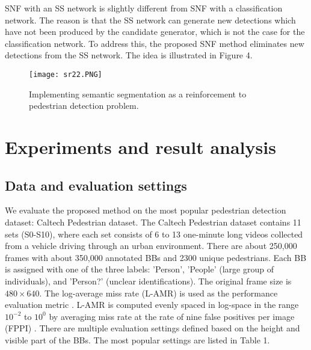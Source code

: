 \documentclass[10pt,letterpaper]{article}
\begin{document}
SNF with an SS network is slightly different from SNF with a classification network. The reason is that the SS network can generate new detections which have not been produced by the candidate generator, which is not the case for the classification network. To address this, the proposed SNF method eliminates new detections from the SS network. The idea is illustrated in Figure 4.

\begin{figure}
\begin{center}
   \texttt{[image: sr22.PNG]}
\end{center}
   \caption{Implementing semantic segmentation as a reinforcement to pedestrian detection problem.}
\label{fig:short}
\end{figure}


\section{Experiments and result analysis}

\subsection{Data and evaluation settings}
We evaluate the proposed method on the most popular pedestrian detection dataset: Caltech Pedestrian dataset. The Caltech Pedestrian dataset contains 11 sets (S0-S10), where each set consists of 6 to 13 one-minute long videos collected from a vehicle driving through an urban environment. There are about 250,000 frames with about 350,000 annotated BBs and 2300 unique pedestrians. Each BB is assigned with one of the three labels: 'Person', 'People' (large group of individuals), and 'Person?' (unclear identifications). 
The original frame size is  $480\times 640$. The log-average miss rate (L-AMR) is used as the performance evaluation metric \cite{caltech}. L-AMR is computed evenly spaced in log-space in the range $10^{-2}$ to $10^0$ by averaging miss rate at the rate of nine false positives per image (FPPI) \cite{caltech}. There are multiple evaluation settings defined based on the height and visible part of the BBs. The most popular settings are listed in Table 1. 
\end{document}
